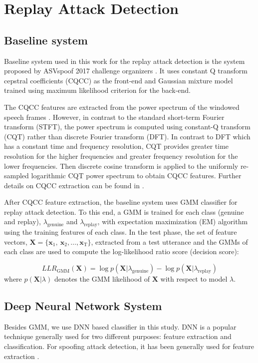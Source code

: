 \documentclass{article}
\begin{document}
\section{Replay Attack Detection}
\label{replay_attack_detection}
\subsection{Baseline system}
\label{baseline_system}
Baseline system used in this work for the replay attack detection is the system proposed by ASVspoof 2017 challenge
organizers \cite{kinnunen2017asvspoof}. It uses constant Q transform cepstral coefficients (CQCC) as the front-end
and Gaussian mixture model trained using maximum likelihood criterion for the back-end.

The CQCC features are extracted from the power spectrum of the windowed speech frames \cite{todisco2016new}. However,
in contrast to the standard short-term Fourier transform (STFT), the power spectrum is computed using constant-Q
transform (CQT) rather than discrete Fourier transform (DFT). In contrast to DFT which has a constant time and
frequency resolution, CQT provides greater time resolution for the higher frequencies and greater frequency resolution
for the lower frequencies. Then discrete cosine transform is applied to the uniformly re-sampled logarithmic CQT power
spectrum to obtain CQCC features. Further details on CQCC extraction can be found in \cite{todisco2016new}.

After CQCC feature extraction, the baseline system uses GMM classifier for replay attack detection. To this end, a GMM
is trained for each class (genuine and replay), $\lambda_{\textrm{genuine}}$ and $\lambda_{\mathrm{replay}}$, with
expectation maximization (EM) algorithm  using the training features of each class. In the test phase, the set of
feature vectors, $\mathbf{X}=\{\mathbf{x}_1,\:\mathbf{x}_2,\ldots,\mathbf{x}_\mathrm{T} \}$, extracted from a test
utterance and the GMMs of each class are used to compute the log-likelihood ratio score (decision score):

\begin{equation}
    LLR_\mathrm{GMM}(\mathbf{X}) = \log p(\mathbf{X}|\lambda_{\textrm{genuine}})- \log p(\mathbf{X}|\lambda_{
        \textrm{replay}})
\end{equation}
where $p(\mathbf{X}|\lambda)$ denotes the GMM likelihood of $\mathbf{X}$ with respect to model $\lambda$.

\subsection{Deep Neural Network System}
\label{dnn_system}
Besides GMM, we use DNN based classifier in this study. DNN is a popular technique generally used for two different
purposes: feature extraction and classification. For spoofing attack detection, it has been generally used for feature
extraction \cite{nagarsheth2017replay, lavrentyeva2017audio}.
\end{document}
